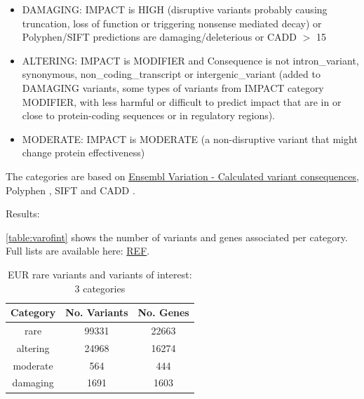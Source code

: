 \documentclass{article}\usepackage[]{graphicx}\usepackage[dvipsnames]{xcolor}
\begin{document}
\begin{itemize}
\item DAMAGING: IMPACT is HIGH (disruptive variants probably causing truncation, loss of function or triggering nonsense mediated decay) or Polyphen/SIFT predictions are damaging/deleterious or CADD $>$ 15 
\item ALTERING: IMPACT is MODIFIER and Consequence is not intron\_variant, synonymous, non\_coding\_transcript or intergenic\_variant (added to DAMAGING variants, some types of variants from IMPACT category MODIFIER, with less harmful or difficult to predict impact that are in or close to protein-coding sequences or in regulatory regions).
\item MODERATE: IMPACT is MODERATE (a non-disruptive variant that might change protein effectiveness)
\end{itemize}

The categories are based on \href{https://www.ensembl.org/info/genome/variation/prediction/predicted_data.html}{Ensembl Variation - Calculated variant consequences}, Polyphen \cite{adzhubei2010method}\cite{adzhubei2013predicting}, SIFT \cite{ng2003sift} and CADD \cite{rentzsch2019cadd}. 

Results:

\autoref{table:varofint} shows the number of variants and genes associated per category. Full lists are available here: \href{REF}{REF}.

 




\begin{table}[h!]
\centering
 \caption{EUR rare variants and variants of interest: 3 categories}
 \begin{tabular}{|c c c|} 
 \hline
Category  &  No. Variants &  No. Genes\\ [0.5ex] 
 \hline\hline
rare & 99331 & 22663  \\
altering & 24968 & 16274  \\
moderate & 564 & 444 \\
damaging & 1691 & 1603 \\[1ex] 
 \hline
 \end{tabular}
\label{table:varofint}
\end{table}
\end{document}
